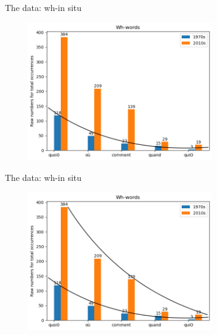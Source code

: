 \documentclass[lesson_slides]{subfiles}
\begin{document}
\begin{frame}[c]{The data: wh-in situ}

    \begin{center}
       \includegraphics[width=10cm, height=6cm]{images/insituraw3.png} 
    \end{center}
  
\end{frame}
\begin{frame}[c]{The data: wh-in situ}

    \begin{center}
       \includegraphics[width=10cm, height=6cm]{images/insituraw4.png} 
    \end{center}
  
\end{frame}
\end{document}
